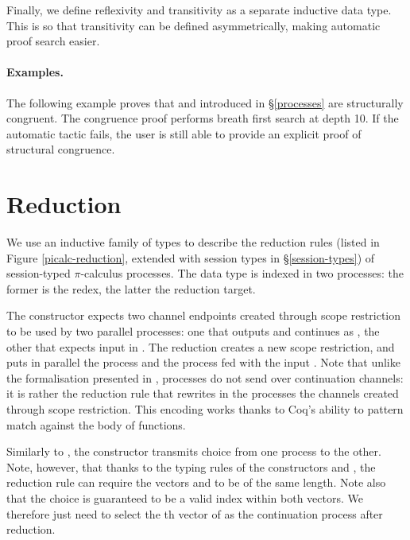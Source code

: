 \documentclass{mproj}
\newcommand{\picalc}{$\pi$-calculus}
\begin{document}

Finally, we define reflexivity and transitivity as a separate inductive data type. This is so that transitivity can be defined asymmetrically, making automatic proof search easier.


\paragraph{Examples.}

The following example proves that  and  introduced in \S \ref{processes} are structurally congruent. The congruence proof performs breath first search at depth 10. If the automatic tactic fails, the user is still able to provide an explicit proof of structural congruence.


\section{Reduction}\label{reduction}

We use an inductive family of types to describe the reduction rules (listed in Figure \ref{picalc-reduction}, extended with session types in \S \ref{session-types}) of session-typed \picalc{} processes. The data type is indexed in two processes: the former is the redex, the latter the reduction target. 


The  constructor expects two channel endpoints created through scope restriction to be used by two parallel processes: one that outputs  and continues as , the other that expects input in . The reduction creates a new scope restriction, and puts in parallel the process  and the process  fed with the input . Note that unlike the formalisation presented in \cite{Dardha2017}, processes do not send over continuation channels: it is rather the reduction rule that rewrites in the processes the channels created through scope restriction. This encoding works thanks to Coq's ability to pattern match against the body of functions.


Similarly to , the  constructor transmits choice from one process to the other. Note, however, that thanks to the typing rules of the constructors  and , the reduction rule can require the vectors  and  to be of the same length. Note also that the choice  is guaranteed to be a valid index within both vectors. We therefore just need to select the th vector of  as the continuation process after reduction.
\end{document}
